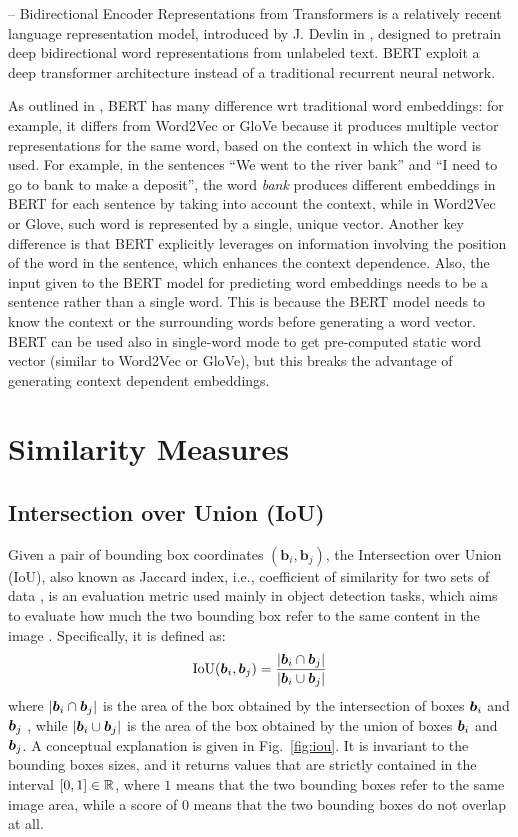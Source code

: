  -- Bidirectional Encoder Representations from
Transformers is a relatively recent language representation model,
introduced by J. Devlin \etal{} in \cite{devlin2018bert}, designed to
pretrain deep bidirectional word representations from unlabeled text.
BERT exploit a deep transformer architecture instead of a traditional
recurrent neural network.

As outlined in \cite{gupta2020differences}, BERT has many difference
wrt traditional word embeddings: for example, it differs from Word2Vec
or GloVe because it produces multiple vector representations for the
same word, based on the context in which the word is used. For
example, in the sentences ``We went to the river bank'' and ``I need
to go to bank to make a deposit'', the word \textit{bank} produces
different embeddings in BERT for each sentence by taking into account
the context, while in Word2Vec or Glove, such word is represented by a
single, unique vector. Another key difference is that BERT explicitly
leverages on information involving the position of the word in the
sentence, which enhances the context dependence. Also, the input given
to the BERT model for predicting word embeddings needs to be a
sentence rather than a single word. This is because the BERT model
needs to know the context or the surrounding words before generating a
word vector. BERT can be used also in single-word mode to get
pre-computed static word vector (similar to Word2Vec or GloVe), but
this breaks the advantage of generating context dependent embeddings.

\section{Similarity Measures}
\label{sec:similarity-measures}

\subsection{Intersection over Union (IoU)}
\label{subsec:iou}

Given a pair of bounding box coordinates $(\bm{b}_i , \bm{b}_j)$, the
Intersection over Union (IoU), also known as Jaccard index, i.e.,
coefficient of similarity for two sets of data
\cite{jaccard1901comparative}, is an evaluation metric used mainly in
object detection tasks, which aims to evaluate how much the two
bounding box refer to the same content in the image
\cite{rigoni2021better, padilla2020survey}. Specifically, it is
defined as:
\[
  \text{IoU}(\bm{b}_i, \bm{b}_j) = \frac{| \bm{b}_i \cap \bm{b}_j |}{| \bm{b}_i \cup \bm{b}_j |}
\]
where $| \bm{b}_i \cap \bm{b}_j |$ is the area of the box obtained by
the intersection of boxes $\bm{b}_i$ and $\bm{b}_j$ , while $| \bm{b}_i
\cup \bm{b}_j |$ is the area of the box obtained by the union of
boxes $\bm{b}_i$ and $\bm{b}_j$. A conceptual explanation is given in
Fig.~\ref{fig:iou}. It is invariant to the bounding boxes sizes, and
it returns values that are strictly contained in the interval $[0, 1]
\in \mathbb{R}$, where $1$ means that the two bounding boxes refer to the
same image area, while a score of $0$ means that the two bounding
boxes do not overlap at all.

